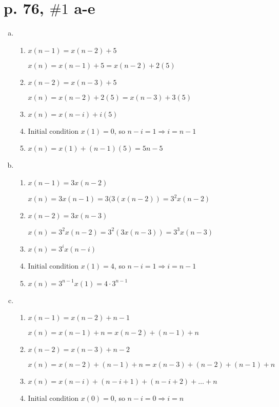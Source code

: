 \documentclass[a4paper,10pt]{article}
\begin{document}
\section*{p. 76, $\#1$ a-e}
\begin{enumerate}[(a)]
\item \begin{enumerate}[Step 1.]
	\item $x(n-1) = x(n-2) + 5$
	
	$x(n) = x(n-1) + 5 = x(n-2) + 2(5)$
	\item $x(n-2) = x(n-3) + 5$
	
	$x(n) = x(n-2) + 2(5) = x(n-3) + 3(5)$
	\item $x(n) = x(n-i) + i(5)$
	
	\item Initial condition $x(1) = 0$, so $n-i = 1 \Rightarrow i = n-1$
	
	\item $x(n) = x(1) + (n-1)(5) = \boxed{5n-5}$
\end{enumerate}

\item \begin{enumerate}[Step 1.]
	\item $x(n-1) = 3x(n-2)$
	
	$x(n) = 3x(n-1) = 3(3(x(n-2)) = 3^2x(n-2)$
	\item $x(n-2) = 3x(n-3)$
	
	$x(n) = 3^2x(n-2) = 3^2(3x(n-3)) = 3^3x(n-3)$
	\item $x(n) = 3^ix(n-i)$
	
	\item Initial condition $x(1) = 4$, so $n-i = 1 \Rightarrow i = n-1$
	
	\item $x(n) = 3^{n-1}x(1) = \boxed{4\cdot 3^{n-1}}$
\end{enumerate}

\item \begin{enumerate}[Step 1.]
	\item $x(n-1) = x(n-2) + n-1$
	
	$x(n) = x(n-1) + n = x(n-2) + (n-1) + n$
	\item $x(n-2) = x(n-3) + n-2$
	
	$x(n) = x(n-2) + (n-1) + n  = x(n-3) + (n-2) + (n-1) + n$
	\item $x(n) = x(n-i) + (n-i+1) + (n-i+2) + \dots + n$
	
	\item Initial condition $x(0) = 0$, so $n-i = 0 \Rightarrow i = n$
	

\end{enumerate}
\end{enumerate}
\end{document}
